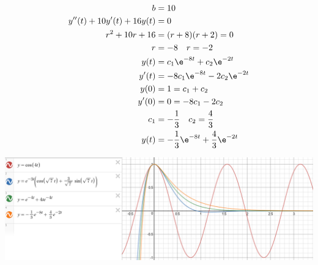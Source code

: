 \documentclass{math}
\begin{document}
\begin{align*}
  b &= 10 \\
  y''(t)+10y'(t)+16y(t) &= 0 \\
  r^2+10r+16 &= (r+8)(r+2) = 0 \\
  r &= -8 \quad r = -2 \\
  y(t) &= c_1\e^{-8t}+c_2\e^{-2t} \\
  y'(t) &= -8c_1\e^{-8t}-2c_2\e^{-2t} \\
  y(0) &= 1 = c_1+c_2 \\
  y'(0) &= 0 = -8c_1-2c_2 \\
  c_1 &= -\frac{1}{3} \quad c_2 = \frac{4}{3} \\
  y(t) &= -\frac{1}{3}\e^{-8t}+\frac{4}{3}\e^{-2t}
\end{align*}
\begin{center}
  \includegraphics[width=20cm]{assets/hw_08_07.png}
\end{center}
\end{document}
